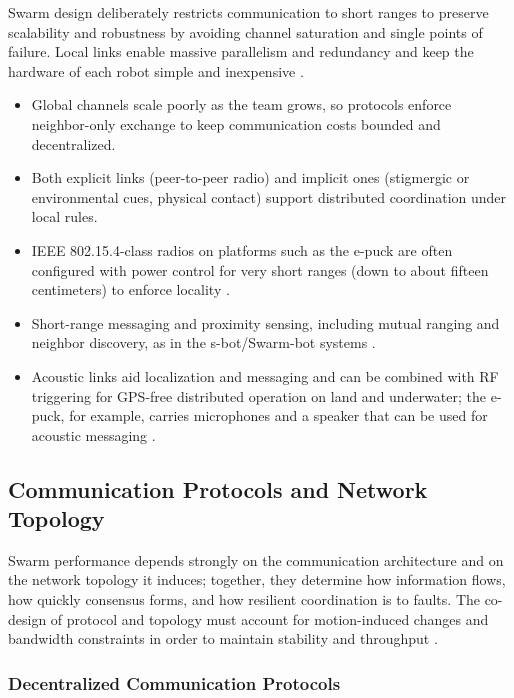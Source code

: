 Swarm design deliberately restricts communication to short ranges to preserve
scalability and robustness by avoiding channel saturation and single points of
failure. Local links enable massive parallelism and redundancy and keep the
hardware of each robot simple and inexpensive \cite{dias2021swarm}.
\begin{itemize}
  \item {} Global channels scale poorly as the team
        grows, so protocols enforce neighbor-only exchange to keep communication
        costs bounded and decentralized.
  \item {} Both explicit links (peer-to-peer radio)
        and implicit ones (stigmergic or environmental cues, physical contact)
        support distributed coordination under local rules.
  \item {} IEEE 802.15.4-class radios on platforms such
        as the e-puck are often configured with power control for very short
        ranges (down to about fifteen centimeters) to enforce locality
        \cite{sahin2007swarm}.
  \item {} Short-range messaging and proximity sensing,
        including mutual ranging and neighbor discovery, as in the
        s-bot/Swarm-bot systems \cite{sahin2005swarm,mondada2003swarmbot}.
  \item {} Acoustic links aid localization and messaging and
        can be combined with RF triggering for GPS-free distributed operation on
        land and underwater; the e-puck, for example, carries microphones and a
        speaker that can be used for acoustic messaging \cite{sahin2007swarm}.
\end{itemize}

\subsection{Communication Protocols and Network Topology}

Swarm performance depends strongly on the communication architecture and on the
network topology it induces; together, they determine how information flows, how
quickly consensus forms, and how resilient coordination is to faults. The
co-design of protocol and topology must account for motion-induced changes and
bandwidth constraints in order to maintain stability and throughput \cite{tan2013research}.

\subsubsection{Decentralized Communication Protocols}

